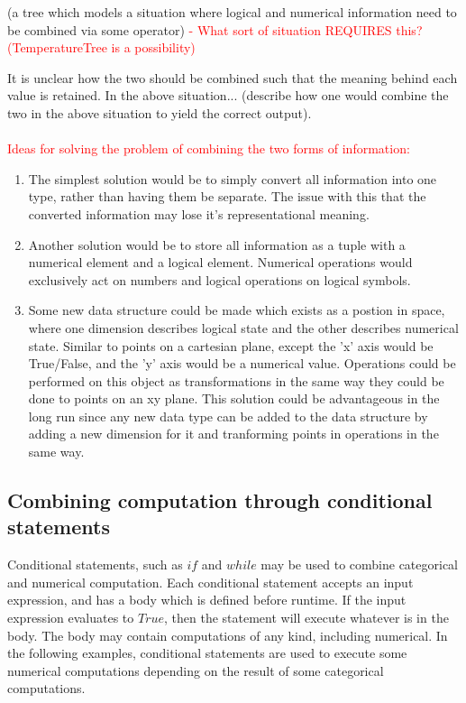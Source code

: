 \documentclass{article}
\begin{document}
(a tree which models a situation where logical and numerical information need to be combined via some operator) \textcolor{red}{- What sort of situation REQUIRES this? (TemperatureTree is a possibility)}

	It is unclear how the two should be combined such that the meaning behind each value is retained. In the above situation... (describe how one would combine the two in the above situation to yield the correct output). \\ \\
	
	\textcolor{red}{Ideas for solving the problem of combining the two forms of information:}
	
\begin{enumerate}

\item The simplest solution would be to simply convert all information into one type, rather than having them be separate. The issue with this that the converted information may lose it's representational meaning.

\item Another solution would be to store all information as a tuple with a numerical element and a logical element. Numerical operations would exclusively act on numbers and logical operations on logical symbols.

\item Some new data structure could be made which exists as a postion in space, where one dimension describes logical state and the other describes numerical state. Similar to points on a cartesian plane, except the 'x' axis would be True/False, and the 'y' axis would be a numerical value. Operations could be performed on this object as transformations in the same way they could be done to points on an xy plane. This solution could be advantageous in the long run since any new data type can be added to the data structure by adding a new dimension for it and tranforming points in operations in the same way.

\end{enumerate}


\subsection{Combining computation through conditional statements}

	Conditional statements, such as $if$ and $while$ may be used to combine categorical and numerical computation. Each conditional statement accepts an input expression, and has a body which is defined before runtime. If the input expression evaluates to $True$, then the statement will execute whatever is in the body. The body may contain computations of any kind, including numerical. In the following examples, conditional statements are used to execute some numerical computations depending on the result of some categorical computations.
\end{document}
